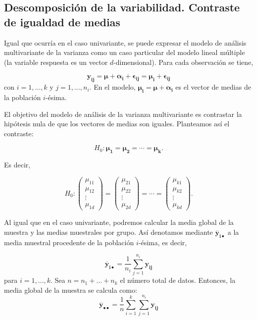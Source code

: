 \documentclass[
  a4paper,
  oneside]{scrbook}
\theoremstyle{definition}
\theoremstyle{definition}
\theoremstyle{definition}
\theoremstyle{definition}
\theoremstyle{remark}
\begin{document}
\subsection{Descomposición de la variabilidad. Contraste de igualdad de medias}\label{descomposicion-de-la-variabilidad-contraste-de-igualdad-de-medias}

Igual que ocurría en el caso univariante, se puede expresar el modelo de
análisis multivariante de la varianza como un caso particular del modelo
lineal múltiple (la variable respuesta es un vector \(d\)-dimensional).
Para cada observación se tiene,

\[\bm{y_{ij}}=\bm{\mu}+\bm{\alpha_i}+\bm{\epsilon_{ij}}=\bm{\mu_i}+\bm{\epsilon_{ij}}\]
con \(i=1,\ldots,k\) y \(j=1,\ldots, n_i\). En el modelo,
\(\bm{\mu_i}=\bm{\mu}+\bm{\alpha_i}\) es el vector de medias de la
población \(i\)-ésima.

El objetivo del modelo de análisis de la varianza multivariante es
contrastar la hipótesis nula de que los vectores de medias son iguales.
Planteamos así el contraste:

\[H_0: \bm{\mu_1}=\bm{\mu_2}=\cdots=\bm{\mu_k}.\]

Es decir,

\[H_0: 
\left(\begin{array}{c}\mu_{11}\\ \mu_{12}\\\vdots\\ \mu_{1d}\end{array}\right)=\left(\begin{array}{c}\mu_{21}\\ \mu_{22}\\\vdots\\ \mu_{2d}\end{array}\right)=\cdots=\left(\begin{array}{c}\mu_{k1}\\ \mu_{k2}\\\vdots\\ \mu_{kd}\end{array}\right).\]

Al igual que en el caso univariante, podremos calcular la media global
de la muestra y las medias muestrales por grupo. Así denotamos mediante
\(\bm{\overline{y}_{i\bullet}}\) a la media muestral procedente de la
población \(i\)-ésima, es decir,

\[\bm{\overline{y}_{i\bullet}}=\frac{1}{n_i}\sum_{j=1}^{n_i} \bm{y_{ij}}\]
para \(i=1,\ldots,k\). Sea \(n=n_1+\ldots+n_k\) el número total de datos.
Entonces, la media global de la muestra se calcula como:
\[\bm{\overline{y}_{\bullet\bullet}}
=\frac{1}{n}\sum_{i=1}^k \sum_{j=1}^{n_i} \bm{y_{ij}}\]
\end{document}
